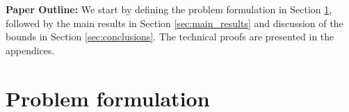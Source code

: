 \documentclass{article}
\begin{document}

\textbf{Paper Outline:}
  We start by defining the problem formulation in Section \ref{sect:Problem_formulation},
  followed by the main results in Section \ref{sec:main_results} and discussion of the bounds in Section \ref{sec:conclusions}.
  The technical proofs are presented in the appendices.
  

\section{Problem formulation}\label{sect:Problem_formulation}
\end{document}
